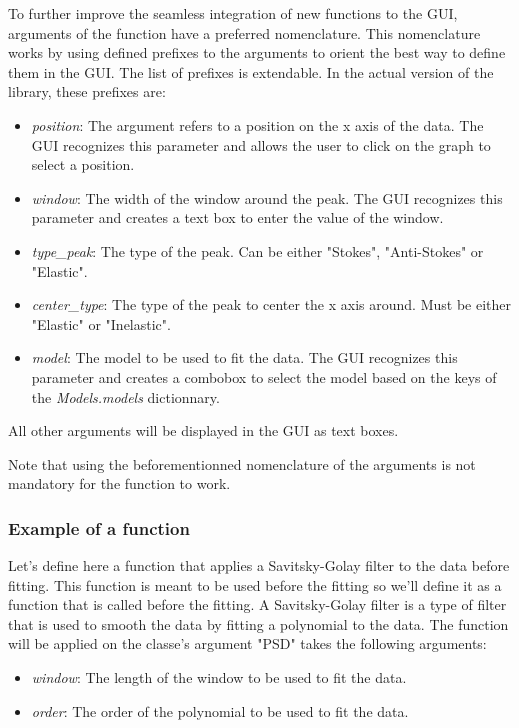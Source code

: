 To further improve the seamless integration of new functions to the GUI, arguments of the function have a preferred nomenclature. This nomenclature works by using defined prefixes to the arguments to orient the best way to define them in the GUI. The list of prefixes is extendable. In the actual version of the library, these prefixes are:
\begin{itemize}
    \item \textit{position}: The argument refers to a position on the x axis of the data. The GUI recognizes this parameter and allows the user to click on the graph to select a position.
    \item \textit{window}: The width of the window around the peak. The GUI recognizes this parameter and creates a text box to enter the value of the window.
    \item \textit{type\_peak}: The type of the peak. Can be either "Stokes", "Anti-Stokes" or "Elastic".
    \item \textit{center\_type}: The type of the peak to center the x axis around. Must be either "Elastic" or "Inelastic".
    \item \textit{model}: The model to be used to fit the data. The GUI recognizes this parameter and creates a combobox to select the model based on the keys of the \textit{Models.models} dictionnary.
\end{itemize}

All other arguments will be displayed in the GUI as text boxes. 

Note that using the beforementionned nomenclature of the arguments is not mandatory for the function to work.

\subsubsection{Example of a function}

Let's define here a function that applies a Savitsky-Golay filter to the data before fitting. This function is meant to be used before the fitting so we'll define it as a function that is called before the fitting. A Savitsky-Golay filter is a type of filter that is used to smooth the data by fitting a polynomial to the data. The function will be applied on the classe's argument "PSD" takes the following arguments:
\begin{itemize}
    \item \textit{window}: The length of the window to be used to fit the data.
    \item \textit{order}: The order of the polynomial to be used to fit the data.
\end{itemize}

